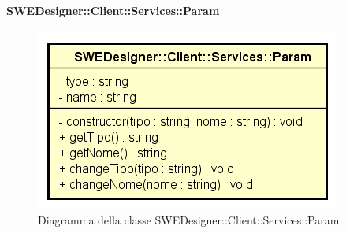 			\paragraph{SWEDesigner::Client::Services::Param}
			\begin{figure}[h!]
			\centering
			\includegraphics[scale=0.8]{Classi/SWEDesigner__Client__Services__Param.png}
			\caption{Diagramma della classe SWEDesigner::Client::Services::Param}
 			\end{figure}
